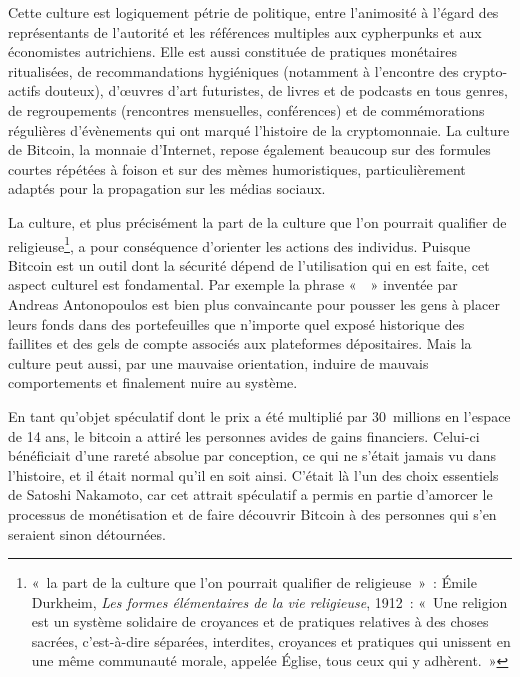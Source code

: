 Cette culture est logiquement pétrie de politique, entre l'animosité à l'égard des représentants de l'autorité et les références multiples aux cypherpunks et aux économistes autrichiens. Elle est aussi constituée de pratiques monétaires ritualisées, de recommandations hygiéniques (notamment à l'encontre des crypto-actifs douteux), d'œuvres d'art futuristes, de livres et de podcasts en tous genres, de regroupements (rencontres mensuelles, conférences) et de commémorations régulières d'évènements qui ont marqué l'histoire de la cryptomonnaie. La culture de Bitcoin, la monnaie d'Internet, repose également beaucoup sur des formules courtes répétées à foison et sur des mèmes humoristiques, particulièrement adaptés pour la propagation sur les médias sociaux.

La culture, et plus précisément la part de la culture que l'on pourrait qualifier de religieuse\footnote{«~la part de la culture que l'on pourrait qualifier de religieuse~»~: Émile Durkheim, \emph{Les formes élémentaires de la vie religieuse}, 1912~: «~Une religion est un système solidaire de croyances et de pratiques relatives à des choses sacrées, c'est-à-dire séparées, interdites, croyances et pratiques qui unissent en une même communauté morale, appelée Église, tous ceux qui y adhèrent.~»}, a pour conséquence d'orienter les actions des individus. Puisque Bitcoin est un outil dont la sécurité dépend de l'utilisation qui en est faite, cet aspect culturel est fondamental. Par exemple la phrase «~~» inventée par Andreas Antonopoulos est bien plus convaincante pour pousser les gens à placer leurs fonds dans des portefeuilles que n'importe quel exposé historique des faillites et des gels de compte associés aux plateformes dépositaires. Mais la culture peut aussi, par une mauvaise orientation, induire de mauvais comportements et finalement nuire au système. %

En tant qu'objet spéculatif dont le prix a été multiplié par 30~millions en l'espace de 14 ans, le bitcoin a attiré les personnes avides de gains financiers. Celui-ci bénéficiait d'une rareté absolue par conception, ce qui ne s'était jamais vu dans l'histoire, et il était normal qu'il en soit ainsi. C'était là l'un des choix essentiels de Satoshi Nakamoto, car cet attrait spéculatif a permis en partie d'amorcer le processus de monétisation et de faire découvrir Bitcoin à des personnes qui s'en seraient sinon détournées.

